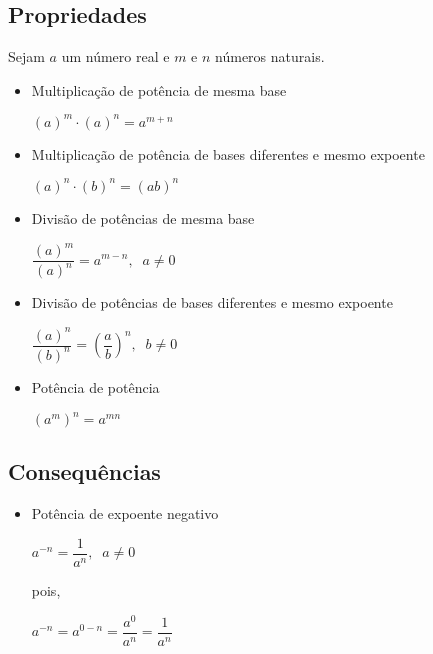	\subsection{Propriedades}
	
	Sejam $a$ um número real e $m$ e $n$ números naturais.
	\begin{itemize}
		\item Multiplicação de potência de mesma base
		\begin{center}
			$(a)^m \cdot (a)^n = a^{m+n}$
		\end{center}
		\item Multiplicação de potência de bases diferentes e mesmo expoente
		\begin{center}
			$(a)^n \cdot (b)^n = (ab)^n$
		\end{center}
		\item Divisão de potências de mesma base
		\begin{center}
			$\dfrac{(a)^m}{(a)^n} = a^{m-n} ,\;\; a \neq 0$
		\end{center}
		\item Divisão de potências de bases diferentes e mesmo expoente
		\begin{center}
			$\dfrac{(a)^n}{(b)^n} = \left( \dfrac{a}{b} \right) ^{n} ,\;\; b \neq 0$
		\end{center}
		\item Potência de potência
		\begin{center}
			$ (a^m)^n = a^{mn}$
		\end{center}
	\end{itemize}    
	
	\subsection{Consequências}
	\begin{itemize}
		\item Potência de expoente negativo
		\begin{center}
			$ a^{-n} = \dfrac{1}{a^n}, \;\; a \neq 0$
		\end{center}
		pois, 
		\begin{center}   
			$a^{-n} = a^{0-n} = \dfrac{a^0}{a^n} = \dfrac{1}{a^n}$ 
		\end{center}
	\end{itemize}   
	
	     
    \begin{texample}
        \centering
    \end{texample}

